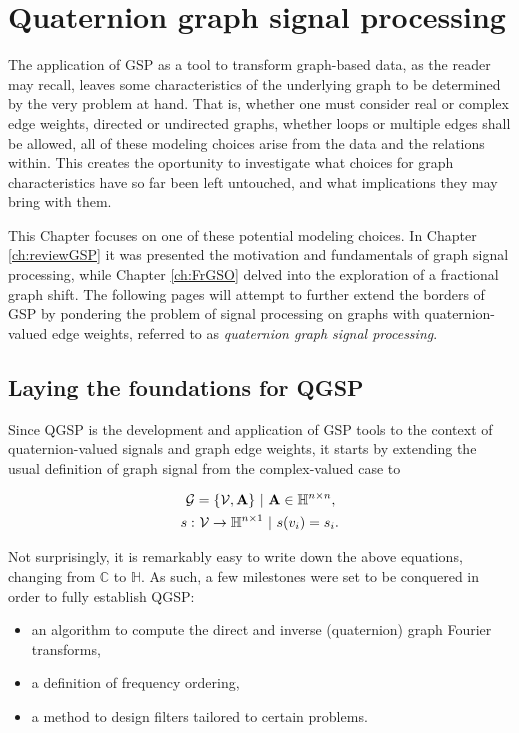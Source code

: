 \chapter{Quaternion graph signal processing}
\label{ch:QGSP}

The application of GSP as a tool to transform graph-based data, as the reader may recall, leaves some characteristics of the underlying graph to be determined by the very problem at hand. That is, whether one must consider real or complex edge weights, directed or undirected graphs, whether loops or multiple edges shall be allowed, all of these modeling choices arise from the data and the relations within. This creates the oportunity to investigate what choices for graph characteristics have so far been left untouched, and what implications they may bring with them.

This Chapter focuses on one of these potential modeling choices. In Chapter \ref{ch:reviewGSP} it was presented the motivation and fundamentals of graph signal processing, while Chapter \ref{ch:FrGSO} delved into the exploration of a fractional graph shift. The following pages will attempt to further extend the borders of GSP by pondering the problem of signal processing on graphs with quaternion-valued edge weights, referred to as \textit{quaternion graph signal processing}.


\section{Laying the foundations for QGSP}

Since QGSP is the development and application of GSP tools to the context of quaternion-valued signals and graph edge weights, it starts by extending the usual definition of graph signal from the complex-valued case to

\begin{align}\label{eq:qgsp_defs}
\mathcal{G} &= \{\mathcal{V}, \mathbf{A}\}  \ | \ \mathbf{A} \in \mathbb{H}^{n \times n}, \notag \\
s: &\ \mathcal{V} \rightarrow \mathbb{H}^{n \times 1} \ | \ s(v_i) = s_i.
\end{align}

Not surprisingly, it is remarkably easy to write down the above equations, changing from $\mathbb{C}$ to $\mathbb{H}$. As such, a few milestones were set to be conquered in order to fully establish QGSP:
\begin{itemize}[noitemsep]
\item an algorithm to compute the direct and inverse (quaternion) graph Fourier transforms,
\item a definition of frequency ordering,
\item a method to design filters tailored to certain problems.
\end{itemize}

